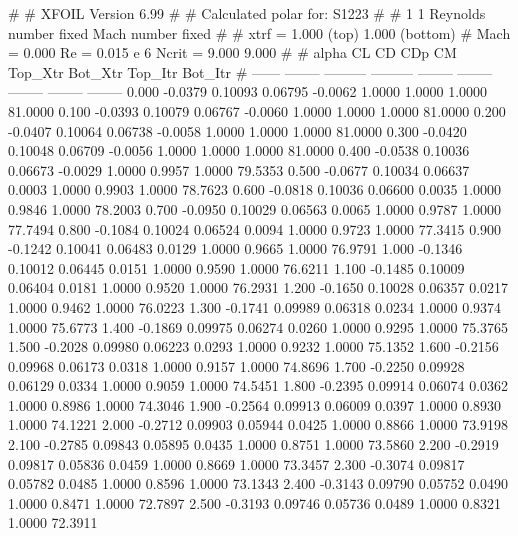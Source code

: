 #  
#       XFOIL         Version 6.99
#  
# Calculated polar for: S1223                                           
#  
# 1 1 Reynolds number fixed          Mach number fixed         
#  
# xtrf =   1.000 (top)        1.000 (bottom)  
# Mach =   0.000     Re =     0.015 e 6     Ncrit =   9.000  9.000
#  
#   alpha    CL        CD       CDp       CM     Top_Xtr  Bot_Xtr  Top_Itr  Bot_Itr
#  ------ -------- --------- --------- -------- -------- -------- -------- --------
   0.000  -0.0379   0.10093   0.06795  -0.0062   1.0000   1.0000   1.0000  81.0000
   0.100  -0.0393   0.10079   0.06767  -0.0060   1.0000   1.0000   1.0000  81.0000
   0.200  -0.0407   0.10064   0.06738  -0.0058   1.0000   1.0000   1.0000  81.0000
   0.300  -0.0420   0.10048   0.06709  -0.0056   1.0000   1.0000   1.0000  81.0000
   0.400  -0.0538   0.10036   0.06673  -0.0029   1.0000   0.9957   1.0000  79.5353
   0.500  -0.0677   0.10034   0.06637   0.0003   1.0000   0.9903   1.0000  78.7623
   0.600  -0.0818   0.10036   0.06600   0.0035   1.0000   0.9846   1.0000  78.2003
   0.700  -0.0950   0.10029   0.06563   0.0065   1.0000   0.9787   1.0000  77.7494
   0.800  -0.1084   0.10024   0.06524   0.0094   1.0000   0.9723   1.0000  77.3415
   0.900  -0.1242   0.10041   0.06483   0.0129   1.0000   0.9665   1.0000  76.9791
   1.000  -0.1346   0.10012   0.06445   0.0151   1.0000   0.9590   1.0000  76.6211
   1.100  -0.1485   0.10009   0.06404   0.0181   1.0000   0.9520   1.0000  76.2931
   1.200  -0.1650   0.10028   0.06357   0.0217   1.0000   0.9462   1.0000  76.0223
   1.300  -0.1741   0.09989   0.06318   0.0234   1.0000   0.9374   1.0000  75.6773
   1.400  -0.1869   0.09975   0.06274   0.0260   1.0000   0.9295   1.0000  75.3765
   1.500  -0.2028   0.09980   0.06223   0.0293   1.0000   0.9232   1.0000  75.1352
   1.600  -0.2156   0.09968   0.06173   0.0318   1.0000   0.9157   1.0000  74.8696
   1.700  -0.2250   0.09928   0.06129   0.0334   1.0000   0.9059   1.0000  74.5451
   1.800  -0.2395   0.09914   0.06074   0.0362   1.0000   0.8986   1.0000  74.3046
   1.900  -0.2564   0.09913   0.06009   0.0397   1.0000   0.8930   1.0000  74.1221
   2.000  -0.2712   0.09903   0.05944   0.0425   1.0000   0.8866   1.0000  73.9198
   2.100  -0.2785   0.09843   0.05895   0.0435   1.0000   0.8751   1.0000  73.5860
   2.200  -0.2919   0.09817   0.05836   0.0459   1.0000   0.8669   1.0000  73.3457
   2.300  -0.3074   0.09817   0.05782   0.0485   1.0000   0.8596   1.0000  73.1343
   2.400  -0.3143   0.09790   0.05752   0.0490   1.0000   0.8471   1.0000  72.7897
   2.500  -0.3193   0.09746   0.05736   0.0489   1.0000   0.8321   1.0000  72.3911

